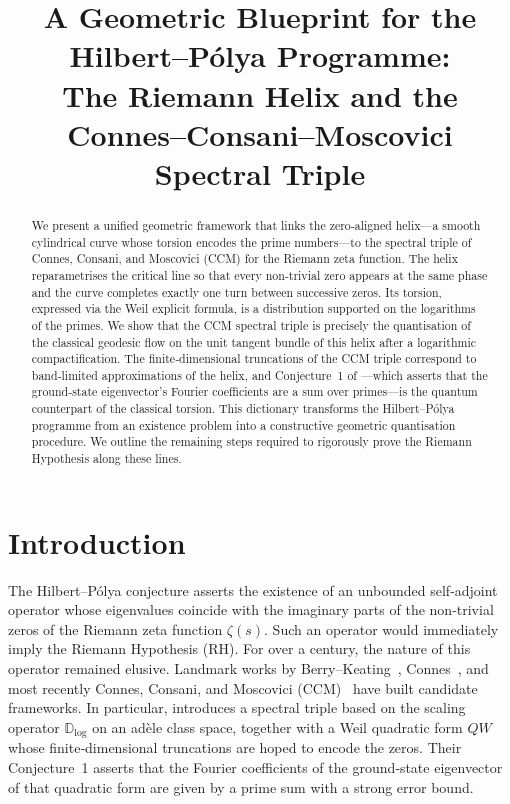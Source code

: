 \documentclass[12pt,a4paper]{article}
\title{\bf A Geometric Blueprint for the Hilbert--P\'olya Programme:\\
The Riemann Helix and the Connes--Consani--Moscovici Spectral Triple}
\author{}
\date{}
\begin{document}
\maketitle

\begin{abstract}
We present a unified geometric framework that links the zero‑aligned helix—a smooth cylindrical curve whose torsion encodes the prime numbers—to the spectral triple of Connes, Consani, and Moscovici (CCM) for the Riemann zeta function. The helix reparametrises the critical line so that every non‑trivial zero appears at the same phase and the curve completes exactly one turn between successive zeros. Its torsion, expressed via the Weil explicit formula, is a distribution supported on the logarithms of the primes. We show that the CCM spectral triple is precisely the quantisation of the classical geodesic flow on the unit tangent bundle of this helix after a logarithmic compactification. The finite‑dimensional truncations of the CCM triple correspond to band‑limited approximations of the helix, and Conjecture~1 of \cite{CCM2025}—which asserts that the ground‑state eigenvector’s Fourier coefficients are a sum over primes—is the quantum counterpart of the classical torsion. This dictionary transforms the Hilbert–P\'olya programme from an existence problem into a constructive geometric quantisation procedure. We outline the remaining steps required to rigorously prove the Riemann Hypothesis along these lines.
\end{abstract}

\section{Introduction}
The Hilbert–P\'olya conjecture asserts the existence of an unbounded self‑adjoint operator whose eigenvalues coincide with the imaginary parts of the non‑trivial zeros of the Riemann zeta function \(\zeta(s)\). Such an operator would immediately imply the Riemann Hypothesis (RH). For over a century, the nature of this operator remained elusive. Landmark works by Berry–Keating~\cite{BerryKeating1999}, Connes~\cite{Connes1999}, and most recently Connes, Consani, and Moscovici (CCM)~\cite{CCM2025} have built candidate frameworks. In particular, \cite{CCM2025} introduces a spectral triple based on the scaling operator \(\mathbb{D}_{\log}\) on an adèle class space, together with a Weil quadratic form \(QW\) whose finite‑dimensional truncations are hoped to encode the zeros. Their Conjecture~1 asserts that the Fourier coefficients of the ground‑state eigenvector of that quadratic form are given by a prime sum with a strong error bound.
\end{document}
